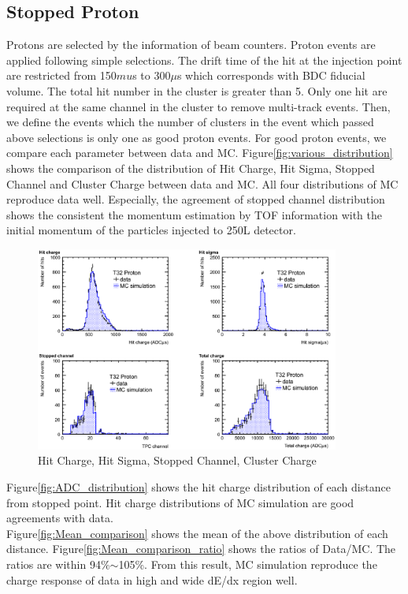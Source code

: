 \subsection{Stopped Proton}

Protons are selected by the information of beam counters.
Proton events are applied following simple selections.
The drift time of the hit at the injection point are restricted from 150$mu$s to 300$\mu$s which corresponds with BDC fiducial volume.
The total hit number in the cluster is greater than 5.
Only one hit are required at the same channel in the cluster to remove multi-track events.
Then, we define the events which the number of clusters in the event which passed above selections is only one as good proton events.
For good proton events, we compare each parameter between data and MC.
Figure\ref{fig:various_distribution} shows the comparison of the distribution of Hit Charge, Hit Sigma, Stopped Channel and  Cluster Charge between data and MC.
All four distributions of MC reproduce data well.
Especially, the agreement of stopped channel distribution shows the consistent the momentum estimation by TOF information with the initial momentum of the particles injected to 250L detector.\\

\begin{figure}[htbp]
  \centering
  \includegraphics[width=10cm,clip]{./fig/stop_proton1.eps}
  \caption{Hit Charge, Hit Sigma, Stopped Channel, Cluster Charge}
  \label{fig:varios_distribution}
\end{figure}

Figure\ref{fig:ADC_distribution} shows the hit charge distribution of each distance from stopped point.
Hit charge distributions of MC simulation are good agreements with data.\\
Figure\ref{fig:Mean_comparison} shows the mean of the above distribution of each distance.
Figure\ref{fig:Mean_comparison_ratio} shows the ratios of Data/MC.
The ratios are within 94\%$\sim$105\%.
From this result, MC simulation reproduce the charge response of data in high and wide dE/dx region well.

